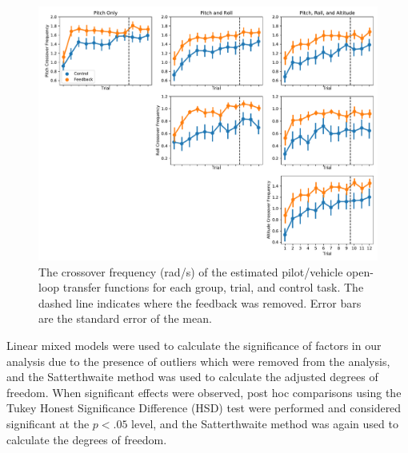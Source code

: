 \begin{figure}[tb]
    \begin{center}
        \includegraphics[width=\linewidth]{figures/Modeling/crossover_measures.pdf}
        \caption[The crossover frequency of the estimated pilot/vehicle open-loop transfer functions for each group, trial, and control task]{The crossover frequency (rad/s) of the estimated pilot/vehicle open-loop transfer functions for each group, trial, and control task.
            The dashed line indicates where the feedback was removed.
            Error bars are the standard error of the mean.}
        \label{figure:arxcomplete}
    \end{center}
\end{figure}

Linear mixed models were used to calculate the significance of factors in our analysis due to the presence of outliers which were removed from the analysis, and the Satterthwaite method was used to calculate the adjusted degrees of freedom.
When significant effects were observed, post hoc comparisons using the Tukey Honest Significance Difference (HSD) test were performed and considered significant at the $p < .05$ level, and the Satterthwaite method was again used to calculate the degrees of freedom.

